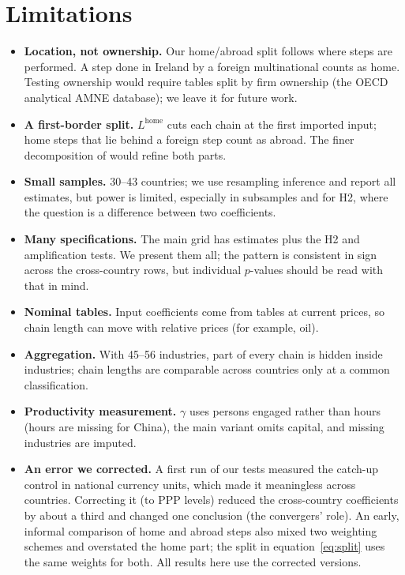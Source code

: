 \documentclass[11pt,a4paper]{article}
\begin{document}
\section{Limitations}\label{sec:limits}

\begin{itemize}
\item \textbf{Location, not ownership.} Our home/abroad split follows where steps
are performed. A step done in Ireland by a foreign multinational counts as home.
Testing ownership would require tables split by firm ownership (the OECD analytical
AMNE database); we leave it for future work.
\item \textbf{A first-border split.} $L^{\text{home}}$ cuts each chain at the
first imported input; home steps that lie behind a foreign step count as abroad.
The finer decomposition of \citet{wang2017} would refine both parts.
\item \textbf{Small samples.} 30--43 countries; we use resampling inference and
report all estimates, but power is limited, especially in subsamples and for H2,
where the question is a difference between two coefficients.
\item \textbf{Many specifications.} The main grid has \NEstimates{} estimates plus
the H2 and amplification tests. We present them all; the pattern is consistent in
sign across the cross-country rows, but individual $p$-values should be read with
that in mind.
\item \textbf{Nominal tables.} Input coefficients come from tables at current
prices, so chain length can move with relative prices (for example, oil).
\item \textbf{Aggregation.} With 45--56 industries, part of every chain is hidden
inside industries; chain lengths are comparable across countries only at a
common classification.
\item \textbf{Productivity measurement.} $\gamma$ uses persons engaged rather than
hours (hours are missing for China), the main variant omits capital, and missing
industries are imputed.
\item \textbf{An error we corrected.} A first run of our tests measured the
catch-up control in national currency units, which made it meaningless across
countries. Correcting it (to PPP levels) reduced the cross-country coefficients by
about a third and changed one conclusion (the convergers' role). An early,
informal comparison of home and abroad steps also mixed two weighting schemes and
overstated the home part; the split in equation~\eqref{eq:split} uses the same
weights for both. All results here use the corrected versions.
\end{itemize}
\end{document}
